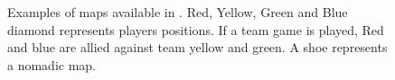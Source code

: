 \begin{figure}
    \caption{Examples of maps available in \aoe{}. Red, Yellow, Green and Blue diamond represents players positions. If a team game is played, Red and blue are allied against team yellow and green. A shoe represents a nomadic map. }
    \label{fig:aoe:maps}
\end{figure}